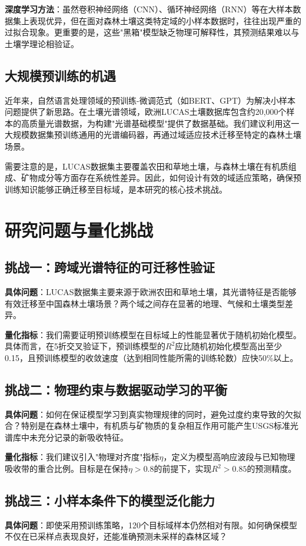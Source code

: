 \documentclass[12pt, a4paper]{article}
\begin{document}
\textbf{深度学习方法}：虽然卷积神经网络（CNN）、循环神经网络（RNN）等在大样本数据集上表现优异，但在面对森林土壤这类特定域的小样本数据时，往往出现严重的过拟合现象。更重要的是，这些"黑箱"模型缺乏物理可解释性，其预测结果难以与土壤学理论相验证。

\subsection{大规模预训练的机遇}
近年来，自然语言处理领域的预训练-微调范式（如BERT、GPT）为解决小样本问题提供了新思路。在土壤光谱领域，欧洲LUCAS土壤数据库包含约20,000个样本的高质量光谱数据，为构建"光谱基础模型"提供了数据基础。我们建议利用这一大规模数据集预训练通用的光谱编码器，再通过域适应技术迁移至特定的森林土壤场景。

需要注意的是，LUCAS数据集主要覆盖农田和草地土壤，与森林土壤在有机质组成、矿物成分等方面存在系统性差异。因此，如何设计有效的域适应策略，确保预训练知识能够正确迁移至目标域，是本研究的核心技术挑战。

\section{研究问题与量化挑战}

\subsection{挑战一：跨域光谱特征的可迁移性验证}
\textbf{具体问题}：LUCAS数据集主要来源于欧洲农田和草地土壤，其光谱特征是否能够有效迁移至中国森林土壤场景？两个域之间存在显著的地理、气候和土壤类型差异。

\textbf{量化指标}：我们需要证明预训练模型在目标域上的性能显著优于随机初始化模型。具体而言，在5折交叉验证下，预训练模型的$R^2$应比随机初始化模型高出至少0.15，且预训练模型的收敛速度（达到相同性能所需的训练轮数）应快50\%以上。

\subsection{挑战二：物理约束与数据驱动学习的平衡}
\textbf{具体问题}：如何在保证模型学习到真实物理规律的同时，避免过度约束导致的欠拟合？特别是在森林土壤中，有机质与矿物质的复杂相互作用可能产生USGS标准光谱库中未充分记录的新吸收特征。

\textbf{量化指标}：我们建议引入"物理对齐度"指标$\eta$，定义为模型高响应波段与已知物理吸收带的重合比例。目标是在保持$\eta > 0.8$的前提下，实现$R^2 > 0.85$的预测精度。

\subsection{挑战三：小样本条件下的模型泛化能力}
\textbf{具体问题}：即使采用预训练策略，120个目标域样本仍然相对有限。如何确保模型不仅在已采样点表现良好，还能准确预测未采样的森林区域？
\end{document}
